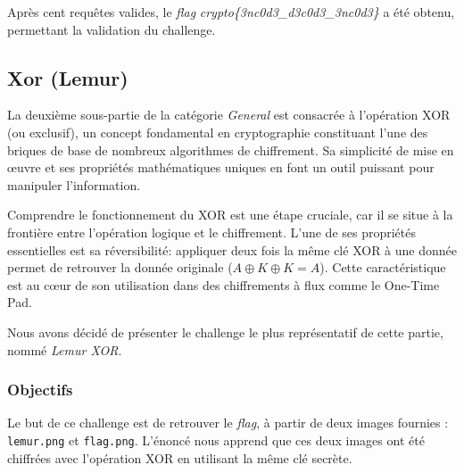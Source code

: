 Après cent requêtes valides, le \textit{flag}
\textit{crypto\{3nc0d3\_d3c0d3\_3nc0d3\}} a été obtenu, permettant la
validation du challenge.

\subsection{Xor (Lemur)}
La deuxième sous-partie de la catégorie \textit{General} est consacrée à
l'opération XOR (ou exclusif), un concept fondamental en cryptographie
constituant l'une des briques de base de nombreux algorithmes de
chiffrement. Sa simplicité de mise en œuvre et ses propriétés
mathématiques uniques en font un outil puissant pour manipuler
l'information.

Comprendre le fonctionnement du XOR est une étape cruciale, car il se
situe à la frontière entre l'opération logique et le chiffrement. L'une
de ses propriétés essentielles est sa réversibilité: appliquer deux fois
la même clé XOR à une donnée permet de retrouver la donnée originale
($A \oplus K \oplus K = A$). Cette caractéristique est au cœur de son
utilisation dans des chiffrements à flux comme le One-Time Pad.

Nous avons décidé de présenter le challenge le plus représentatif de
cette partie, nommé \textit{Lemur XOR}.

\subsubsection{Objectifs}
Le but de ce challenge est de retrouver le \textit{flag}, à partir de
deux images fournies : \texttt{lemur.png} et \texttt{flag.png}. L'énoncé
nous apprend que ces deux images ont été chiffrées avec l'opération XOR en
utilisant la même clé secrète.

